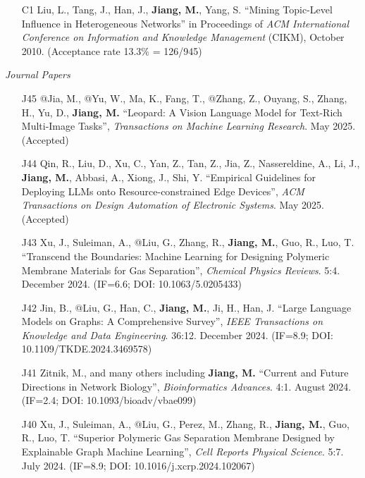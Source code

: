 \documentclass[10pt]{article}
\newenvironment{myindentpar}[1]%
{\begin{list}{}%
         {\setlength{\leftmargin}{#1}}%
         \item[]%
}
{\end{list}}
\newcounter{list}
\begin{document}
\begin{myindentpar}{0.00cm}
\begin{enumerate}[leftmargin=.5cm]
\item[C1] Liu, L., Tang, J., Han, J., \textbf{Jiang, M.}, Yang, S. ``Mining Topic-Level Influence in Heterogeneous Networks'' in Proceedings of \textit{ACM International Conference on Information and Knowledge Management} (CIKM), October 2010. (Acceptance rate 13.3\% = 126/945)

\end{enumerate}

\hspace{-0.25cm}\textit{Journal Papers}

\begin{enumerate}[leftmargin=.5cm]

\item[J45] @Jia, M., @Yu, W., Ma, K., Fang, T., @Zhang, Z., Ouyang, S., Zhang, H., Yu, D., \textbf{Jiang, M.} ``Leopard: A Vision Language Model for Text-Rich Multi-Image Tasks'', \textit{Transactions on Machine Learning Research}. May 2025. (Accepted)

\item[J44] Qin, R., Liu, D., Xu, C., Yan, Z., Tan, Z., Jia, Z., Nassereldine, A., Li, J., \textbf{Jiang, M.}, Abbasi, A., Xiong, J., Shi, Y. ``Empirical Guidelines for Deploying LLMs onto Resource-constrained Edge Devices'', \textit{ACM Transactions on Design Automation of Electronic Systems}. May 2025. (Accepted)

\item[J43] Xu, J., Suleiman, A., @Liu, G., Zhang, R., \textbf{Jiang, M.}, Guo, R., Luo, T. ``Transcend the Boundaries: Machine Learning for Designing Polymeric Membrane Materials for Gas Separation'', \textit{Chemical Physics Reviews}. 5:4. December 2024. (IF=6.6; DOI: 10.1063/5.0205433)

\item[J42] Jin, B., @Liu, G., Han, C., \textbf{Jiang, M.}, Ji, H., Han, J. ``Large Language Models on Graphs: A Comprehensive Survey'', \textit{IEEE Transactions on Knowledge and Data Engineering}. 36:12. December 2024. (IF=8.9; DOI: 10.1109/TKDE.2024.3469578)

\item[J41] Zitnik, M., and many others including \textbf{Jiang, M.} ``Current and Future Directions in Network Biology'', \textit{Bioinformatics Advances}. 4:1. August 2024. (IF=2.4; DOI: 10.1093/bioadv/vbae099)

\item[J40] Xu, J., Suleiman, A., @Liu, G., Perez, M., Zhang, R., \textbf{Jiang, M.}, Guo, R., Luo, T. ``Superior Polymeric Gas Separation Membrane Designed by Explainable Graph Machine Learning'', \textit{Cell Reports Physical Science}. 5:7. July 2024. (IF=8.9; DOI: 10.1016/j.xcrp.2024.102067)
	

\end{enumerate}
\end{myindentpar}
\end{document}
